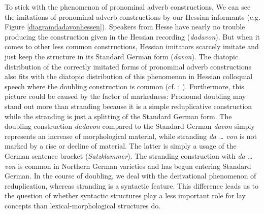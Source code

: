 \documentclass[output=paper]{LSP/langsci}
\begin{document}
To stick with the phenomenon of pronominal adverb constructions, We can see the imitations of pronominal adverb constructions by our Hessian informants (e.g. Figure \ref{diagramdadavonhessen}). Speakers from Hesse have nearly no trouble producing the construction given in the Hessian recording (\textit{dadavon}). But when it comes to other less common constructions, Hessian imitators  scarcely imitate and just keep the structure in its Standard German form (\textit{davon}). The diatopic distribution of the correctly imitated forms of pronominal adverb constructions also fits with the diatopic distribution of this phenomenon in Hessian colloquial speech where the doubling construction is common (cf. \cite{leser_zum_2012}; \cite[Round 1 Questions 11, 12; Round 2 Question 21]{ADA}). Furthermore, this picture could be caused by the factor of markedness: Pronound doubling may stand out more than stranding because it is a simple reduplicative construction while the stranding is just a splitting of the Standard German form. The doubling construction \textit{dadavon} compared to the Standard German \textit{davon} simply represents an increase of morphological material, while stranding \textit{da … von} is not marked by a rise or decline of material. The latter is simply a usage of the German sentence bracket (\textit{Satzklammer}).  The stranding construction with \textit{da … von} is common in Northern German varieties and has begun entering Standard German. In the course of  doubling, we deal with the derivational phenomenon of reduplication, whereas stranding is a syntactic feature. This difference leads us to the question of whether syntactic structures play a less important role for lay concepts than lexical-morphological structures do.
\end{document}

